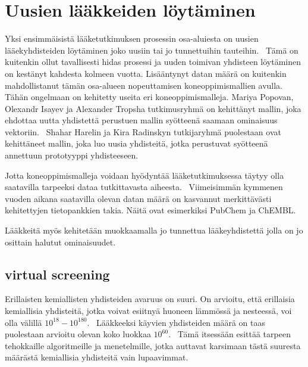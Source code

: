 \documentclass[finnish,twoside,censored,subject,sw-line]{HYthesisML}
\begin{document}
\chapter{Uusien lääkkeiden löytäminen}


Yksi ensimmäisistä lääketutkimuksen prosessin osa-aluiesta on uusien lääekyhdisteiden löytäminen joko uusiin tai jo tunnettuihin tauteihin.~\cite{EkinsSean2019Emlf}
Tämä on kuitenkin ollut tavallisesti hidas prosessi ja uuden toimivan yhdisteen löytäminen on kestänyt kahdesta kolmeen vuotta.
Lisääntynyt datan määrä on kuitenkin mahdollistanut tämän osa-alueen nopeuttamisen koneoppimismallien avulla.
Tähän ongelmaan on kehitetty useita eri koneoppimismalleja.
Mariya Popovan, Olexandr Isayev ja Alexander Tropsha tutkimusryhmä on kehittänyt mallin, joka ehdottaa uutta yhdistettä perustuen mallin syötteenä saamaan ominaisuus vektoriin.~\cite{PopovaMariya2018Drlf}
Shahar Harelin ja Kira Radinskyn tutkijaryhmä puolestaan ovat kehittäneet mallin, joka luo uusia yhdisteitä, jotka perustuvat syötteenä annettuun prototyyppi yhdisteeseen.~\cite{ShaharHarelAndKiraRadinsky}

Jotta koneoppimismalleja voidaan hyödyntää lääketutkimuksessa täytyy olla saatavilla tarpeeksi dataa tutkittavasta aiheesta.~\cite{EkinsSean2019Emlf}
Viimeisimmän kymmenen vuoden aikana saatavilla olevan datan määrä on kasvannut merkittävästi kehitettyjen tietopankkien takia.
Näitä ovat esimerkiksi PubChem ja ChEMBL.

Lääkkeitä myös kehitetään muokkaamalla jo tunnettua lääkeyhdistettä jolla on jo osittain halutut ominaisuudet.~\cite{ShaharHarelAndKiraRadinsky}


\section{virtual screening}

Erillaisten kemiallisten yhdisteiden avaruus on suuri.
On arvioitu, että erillaisia kemiallisia yhdisteitä, jotka voivat esiitnyä huoneen lämmössä ja nesteessä, voi olla välillä $10^{18} - 10^{180}$.~\cite{SotrifferChristoph2011VSPC}
Lääkkeeksi käyvien yhdisteiden määrä on taas puolestaan arvioitu olevan koko luokkaa $10^{60}$.~\cite{SotrifferChristoph2011VSPC}
Tämä itsessään esittää tarpeen tehokkaille algoritmeille ja menetelmille, jotka auttavat karsimaan tästä suuresta määrästä kemiallisia yhdisteitä vain lupaavimmat.
\end{document}
